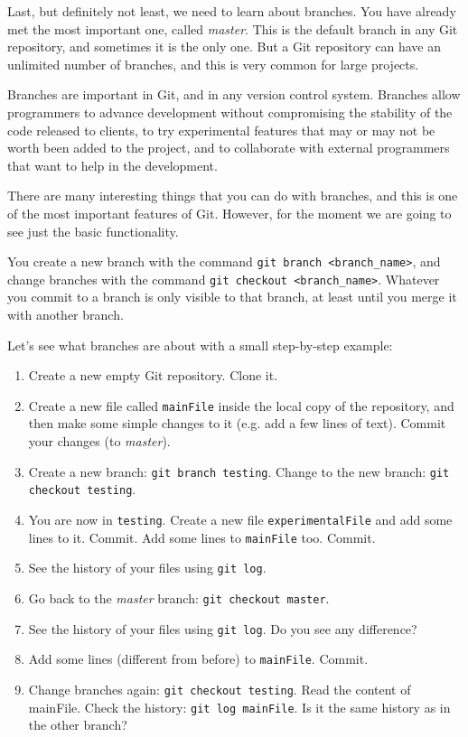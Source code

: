 Last, but definitely not least, we need to learn about branches. You
have already met the most important one, called \emph{master}. This is
the default branch in any Git repository, and sometimes it is the only
one. But a Git repository can have an unlimited number of branches,
and this is very common for large projects. 

Branches are important in Git, and in any version control
system. Branches allow programmers to advance development without
compromising the stability of the code released to clients, to try
experimental features that may or may not be worth been added to the
project, and to collaborate with external programmers that want to
help in the development. 

There are many interesting things that you can do with branches, and
this is one of the most important features of Git. However, for the
moment we are going to see just the basic functionality. 

You create a new branch with the command 
\verb+git branch <branch_name>+, and change branches with the command
\verb+git checkout <branch_name>+. Whatever you commit to a branch is
only visible to that branch, at least until you merge it with another
branch. 

Let's see what branches are about with a small step-by-step example: 

\begin{enumerate}
\item Create a new empty Git repository. Clone it.
\item Create a new file called \verb+mainFile+ inside 
  the local copy of the repository, and then make some
  simple changes to it (e.g. add a few lines of text). 
  Commit your changes (to \emph{master}). 
\item Create a new branch: \verb+git branch testing+. Change to the
  new branch: \verb+git checkout testing+.
\item You are now in \verb+testing+. Create a new file
  \verb+experimentalFile+ and add some lines to it. Commit. 
  Add some lines
  to \verb+mainFile+ too. Commit.
\item See the history of your files using \verb+git log+.
\item Go back to the \emph{master} branch: 
  \verb+git checkout master+. 
\item See the history of your files using \verb+git log+. Do you see
  any difference?
\item Add some lines (different from before) to
  \verb+mainFile+. Commit.
\item Change branches again: \verb+git checkout testing+. Read the
  content of mainFile. Check the history: \verb+git log mainFile+. Is
  it the same history as in the other branch?
\end{enumerate}

